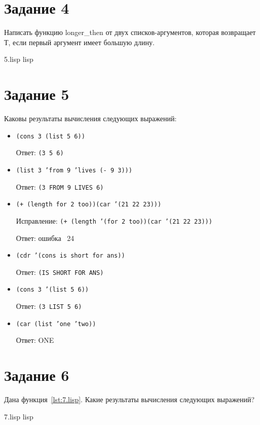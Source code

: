 \section{Задание 4}
Написать функцию longer\_then от двух списков-аргументов, которая возвращает Т, если первый аргумент имеет большую длину.

{5.lisp}
{lisp}
{}

\section{Задание 5}
Каковы результаты вычисления следующих выражений:

\begin{itemize}
	\item \texttt{(cons 3 (list 5 6))}
	
	Ответ: \texttt{(3 5 6)}
	
	\item \texttt{(list 3 'from 9 'lives (- 9 3)))}
	
	Ответ: \texttt{(3 FROM 9 LIVES 6)}
	
	\item \texttt{(+ (length for 2 too))(car '(21 22 23)))}
	
	Исправление: \texttt{(+ (length '(for 2 too))(car '(21 22 23)))}
	
	Ответ: ошибка \ 24
	
	\item \texttt{(cdr '(cons is short for ans))}
	
	Ответ: \texttt{(IS SHORT FOR ANS)}
	
	\item \texttt{(cons 3 '(list 5 6))}
	
	Ответ: \texttt{(3 LIST 5 6)}
	
	\item \texttt{(car (list 'one 'two))}
	
	Ответ: ONE
\end{itemize}

\section{Задание 6}

Дана функция~\ref{lst:7.lisp}. Какие результаты вычисления следующих выражений?

{7.lisp}
{lisp}
{}


